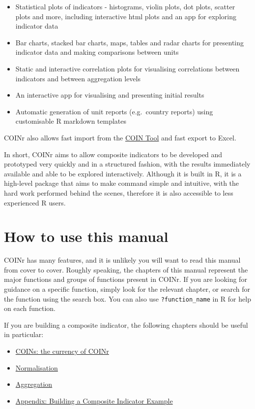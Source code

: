 \documentclass[
]{book}
\providecommand{\tightlist}{%
  \setlength{\itemsep}{0pt}\setlength{\parskip}{0pt}}
\begin{document}
\begin{itemize}
\tightlist
\item
  Statistical plots of indicators - histograms, violin plots, dot plots, scatter plots and more, including interactive html plots and an app for exploring indicator data
\item
  Bar charts, stacked bar charts, maps, tables and radar charts for presenting indicator data and making comparisons between units
\item
  Static and interactive correlation plots for visualising correlations between indicators and between aggregation levels
\item
  An interactive app for visualising and presenting initial results
\item
  Automatic generation of unit reports (e.g.~country reports) using customisable R markdown templates
\end{itemize}

COINr also allows fast import from the \href{https://knowledge4policy.ec.europa.eu/composite-indicators/coin-tool_en}{COIN Tool} and fast export to Excel.

In short, COINr aims to allow composite indicators to be developed and prototyped very quickly and in a structured fashion, with the results immediately available and able to be explored interactively. Although it is built in R, it is a high-level package that aims to make command simple and intuitive, with the hard work performed behind the scenes, therefore it is also accessible to less experienced R users.

\hypertarget{how-to-use-this-manual}{%
\section{How to use this manual}\label{how-to-use-this-manual}}

COINr has many features, and it is unlikely you will want to read this manual from cover to cover. Roughly speaking, the chapters of this manual represent the major functions and groups of functions present in COINr. If you are looking for guidance on a specific function, simply look for the relevant chapter, or search for the function using the search box. You can also use \texttt{?function\_name} in R for help on each function.

If you are building a composite indicator, the following chapters should be useful in particular:

\begin{itemize}
\tightlist
\item
  \protect\hyperlink{coins-the-currency-of-coinr}{COINs: the currency of COINr}
\item
  \protect\hyperlink{normalisation-1}{Normalisation}
\item
  \protect\hyperlink{aggregation-1}{Aggregation}
\item
  \protect\hyperlink{appendix-building-a-composite-indicator-example}{Appendix: Building a Composite Indicator Example}
\end{itemize}
\end{document}
